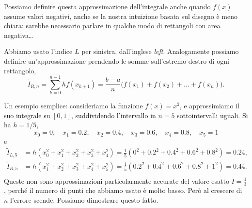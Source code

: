 \documentclass[a4paper]{report}
\theoremstyle{definiton}
\theoremstyle{remark}
\begin{document}
Possiamo definire questa approssimazione dell'integrale anche quando $f(x)$ assume valori negativi, anche se la nostra intuizione basata sul disegno è meno chiara: sarebbe necessario parlare in qualche modo di rettangoli con area negativa\dots

Abbiamo usato l'indice $L$ per sinistra, dall'inglese \emph{left}. Analogamente possiamo definire un'approssimazione prendendo le somme sull'estremo destro di ogni rettangolo, 
\[
\tilde{I}_{R,n} = \sum_{k=0}^{n-1} hf(x_{k+1}) = \frac{b-a}{n} \biggl( f(x_1) + f(x_2) + \dots + f(x_{n}) \biggr).
\]

Un esempio semplice: consideriamo la funzione $f(x)=x^2$, e approssimiamo il suo integrale su $[0,1]$, suddividendo l'intervallo in $n=5$ sottointervalli uguali. Si ha $h=1/5$,
\[
x_0 = 0, \quad x_1 = 0.2, \quad x_2=0.4,\quad x_3=0.6,\quad x_4 = 0.8,\quad x_5=1
\]
e
\begin{align*}
    \tilde{I}_{L,5} &= h (x_0^2+x_1^2+x_2^2+x_3^2+x_4^2) = \frac{1}{5}\left(0^2+0.2^2+0.4^2+0.6^2+0.8^2\right) = 0.24,\\
    \tilde{I}_{R,5} &= h (x_1^2+x_2^2+x_3^2+x_4^2+x_5^2) = \frac{1}{5}\left(0.2^2+0.4^2+0.6^2+0.8^2+1^2\right) = 0.44.\\
\end{align*}
Queste non sono approssimazioni particolarmente accurate del valore esatto $I=\frac{1}{3}$, perché il numero di punti che abbiamo usato è molto basso. Però al crescere di $n$ l'errore scende. Possiamo dimostrare questo fatto.
\end{document}
